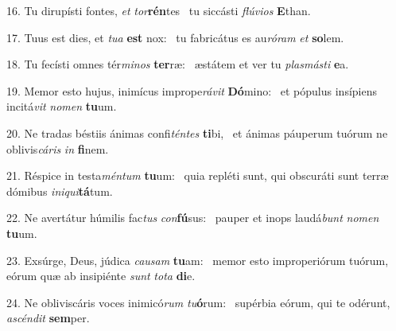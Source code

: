 16. Tu dirupísti fontes, \textit{et} \textit{tor}\textbf{rén}tes \ast\  tu siccásti \textit{flú}\textit{vi}\textit{os} \textbf{E}than.\

17. Tuus est dies, et \textit{tu}\textit{a} \textbf{est} nox: \ast\  tu fabricátus es au\textit{ró}\textit{ram} \textit{et} \textbf{so}lem.\

18. Tu fecísti omnes tér\textit{mi}\textit{nos} \textbf{ter}ræ: \ast\  æstátem et ver tu \textit{plas}\textit{más}\textit{ti} \textbf{e}a.\

19. Memor esto hujus, inimícus imprope\textit{rá}\textit{vit} \textbf{Dó}mino: \ast\  et pópulus insípiens incitá\textit{vit} \textit{no}\textit{men} \textbf{tu}um.\

20. Ne tradas béstiis ánimas confi\textit{tén}\textit{tes} \textbf{ti}bi, \ast\  et ánimas páuperum tuórum ne oblivis\textit{cá}\textit{ris} \textit{in} \textbf{fi}nem.\

21. Réspice in testa\textit{mén}\textit{tum} \textbf{tu}um: \ast\  quia repléti sunt, qui obscuráti sunt terræ dómibus \textit{in}\textit{i}\textit{qui}\textbf{tá}tum.\

22. Ne avertátur húmilis fac\textit{tus} \textit{con}\textbf{fú}sus: \ast\  pauper et inops laudá\textit{bunt} \textit{no}\textit{men} \textbf{tu}um.\

23. Exsúrge, Deus, júdica \textit{cau}\textit{sam} \textbf{tu}am: \ast\  memor esto improperiórum tuórum, eórum quæ ab insipiénte \textit{sunt} \textit{to}\textit{ta} \textbf{di}e.\

24. Ne obliviscáris voces inimicó\textit{rum} \textit{tu}\textbf{ó}rum: \ast\  supérbia eórum, qui te odérunt, \textit{a}\textit{scén}\textit{dit} \textbf{sem}per.\


